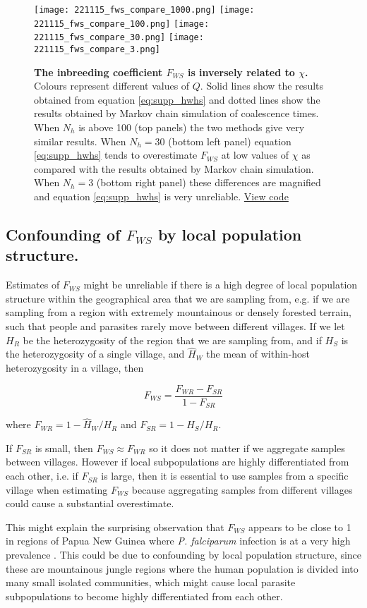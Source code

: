 \documentclass[_main.tex]{subfiles}
\begin{document}
\begin{figure}[h!]
\centering
\texttt{[image: 221115\_fws\_compare\_1000.png]}
\texttt{[image: 221115\_fws\_compare\_100.png]}
\texttt{[image: 221115\_fws\_compare\_30.png]}
\texttt{[image: 221115\_fws\_compare\_3.png]}
\caption{\textbf{The inbreeding coefficient $F_{WS}$ is inversely related to $\chi$.}  Colours represent different values of $Q$.  Solid lines show the results obtained from equation \ref{eq:supp_hwhs} and dotted lines show the results obtained by Markov chain simulation of coalescence times.  When $N_h$ is above 100 (top panels) the two methods give very similar results.  When $N_h = 30$ (bottom left panel) equation \ref{eq:supp_hwhs} tends to overestimate $F_{WS}$ at low values of $\chi$ as compared with the results obtained by Markov chain simulation.  When $N_h = 3$ (bottom right panel) these differences are magnified and equation \ref{eq:supp_hwhs} is very unreliable. 
\href{https://github.com/d-kwiat/gtg/blob/main/fws_compare_methods.ipynb}{View code}
}
\label{fig:supp_fws_compare_methods}
\end{figure}

\subsection{Confounding of $F_{WS}$ by local population structure.}
\label{supp_fws_pop_structure}  

Estimates of $F_{WS}$ might be unreliable if there is a high degree of local population structure within the geographical area that we are sampling from, e.g. if we are sampling from a region with extremely mountainous or densely forested terrain, such that people and parasites rarely move between different villages.  If we let $H_R$ be the heterozygosity of the region that we are sampling from, and if $H_S$ is the heterozygosity of a single village, and $\widehat{H}_W$ the mean of within-host heterozygosity in a village, then 

\begin{equation*}
F_{WS} = \frac{F_{WR} - F_{SR}}{1 - F_{SR}}
\end{equation*}

where $F_{WR} = 1 - \widehat{H}_W / H_R$ and $F_{SR} = 1 - H_S / H_R$.  

If $F_{SR}$ is small, then $F_{WS} \approx F_{WR}$ so it does not matter if we aggregate samples between villages.  However if local subpopulations are highly differentiated from each other, i.e. if $F_{SR}$ is large, then it is essential to use samples from a specific village when estimating $F_{WS}$ because aggregating samples from different villages could cause a substantial overestimate.

This might explain the surprising observation that $F_{WS}$ appears to be close to 1 in regions of Papua New Guinea where \textit{P. falciparum} infection is at a very high prevalence \cite{Manske2012,MalariaGEN2021}.  This could be due to confounding by local population structure, since these are mountainous jungle regions where the human population is divided into many small isolated communities, which might cause local parasite subpopulations to become highly differentiated from each other.
\end{document}
